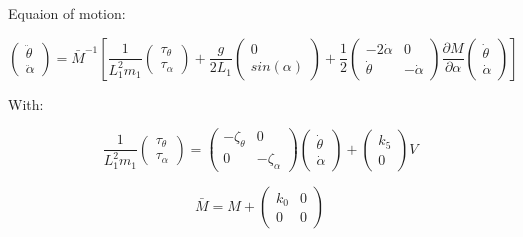 
Equaion of motion:

\begin{equation}
\left( \begin{matrix}
        \ddot \theta \\
        \ddot \alpha
    \end{matrix} \right) = \bar M^{-1} \left[
\frac{1}{ L_1^2 m_1}
    \left( \begin{matrix}
        \tau_{\theta} \\
        \tau_{\alpha}
    \end{matrix} \right)
    +\frac{g}{2L_1}
    \left( \begin{matrix}
        0 \\
        sin( \alpha)
    \end{matrix} \right)
     + \frac{1}{2} \left( \begin{matrix}
    - 2 \dot \alpha & 0\\
        \dot \theta & -\dot \alpha
    \end{matrix} \right)
    \frac{\partial M}{\partial \alpha}
     \left( \begin{matrix}
        \dot \theta \\
        \dot \alpha
    \end{matrix} \right) \right]
\end{equation}

With:

\begin{equation}
\frac{1}{ L_1^2 m_1}
    \left( \begin{matrix}
        \tau_{\theta} \\
        \tau_{\alpha}
    \end{matrix} \right)
    = \left( \begin{matrix}
        -\zeta_\theta & 0 \\ 0 & -\zeta_\alpha
    \end{matrix}\right)
    \left( \begin{matrix}
        \dot \theta \\ \dot \alpha
    \end{matrix}\right)
    +
    \left( \begin{matrix}
    k_5 \\ 0    
    \end{matrix}\right)
    V
\end{equation}


\begin{equation}
    \bar M = M + 
    \left( \begin{matrix}
       k_0 & 0 \\ 0 & 0
    \end{matrix} \right)
\end{equation}

